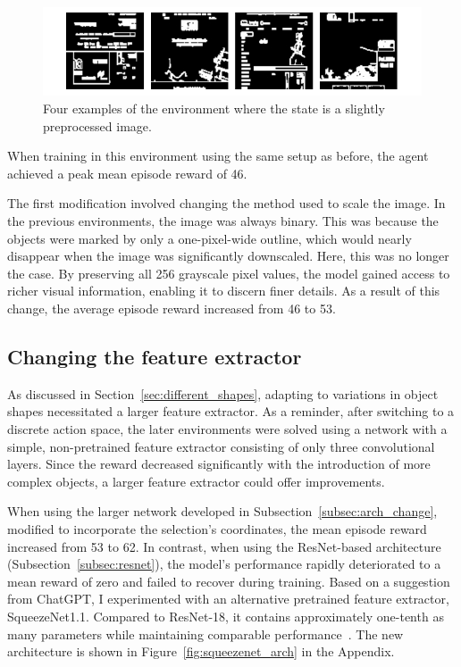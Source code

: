 \documentclass[
  digital,     %
  oneside,     %
  nosansbold,  %
  nocolorbold, %
  lof,         %
  lot,         %
]{fithesis4}
\begin{document}
\begin{figure}
    \centering
    \includegraphics[width=1\linewidth]{env_examples/env9.pdf}
    \caption{Four examples of the environment where the state is a slightly preprocessed image.}
    \label{fig:env9}
\end{figure}

When training in this environment using the same setup as before, the agent achieved a peak mean episode reward of 46.

The first modification involved changing the method used to scale the image. In the previous environments, the image was always binary. This was because the objects were marked by only a one-pixel-wide outline, which would nearly disappear when the image was significantly downscaled. Here, this was no longer the case. By preserving all 256 grayscale pixel values, the model gained access to richer visual information, enabling it to discern finer details. As a result of this change, the average episode reward increased from 46 to 53.

\subsection{Changing the feature extractor}
\label{subsec:feat_extract_two}

As discussed in Section~\ref{sec:different_shapes}, adapting to variations in object shapes necessitated a larger feature extractor. As a reminder, after switching to a discrete action space, the later environments were solved using a network with a simple, non-pretrained feature extractor consisting of only three convolutional layers. Since the reward decreased significantly with the introduction of more complex objects, a larger feature extractor could offer improvements.

When using the larger network developed in Subsection~\ref{subsec:arch_change}, modified to incorporate the selection's coordinates, the mean episode reward increased from 53 to 62. In contrast, when using the ResNet-based architecture (Subsection~\ref{subsec:resnet}), the model's performance rapidly deteriorated to a mean reward of zero and failed to recover during training. Based on a suggestion from ChatGPT, I experimented with an alternative pretrained feature extractor, SqueezeNet1.1. Compared to ResNet-18, it contains approximately one-tenth as many parameters while maintaining comparable performance~\cite{torchvision2016}. The new architecture is shown in Figure~\ref{fig:squeezenet_arch} in the Appendix.
\end{document}
